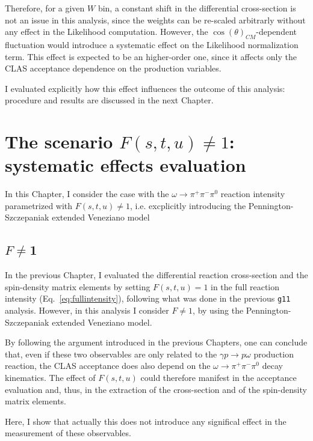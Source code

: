 \documentclass[a4paper,10pt]{report}
\newcommand{\decay}{$\omega \rightarrow \pi^+ \pi^- \pi^0$ }
\newcommand{\production}{$\gamma p \rightarrow p \omega$ }
\begin{document}
Therefore, for a given $W$ bin, a constant shift in the differential cross-section is not an issue in this analysis, since the weights can be re-scaled arbitrarly without any effect in the Likelihood computation. However, the $\cos(\theta)_{CM}$-dependent fluctuation would introduce a systematic effect on the Likelihood normalization term. This effect is expected to be an higher-order one, since it affects only the CLAS acceptance dependence on the production variables.

I evaluated explicitly how this effect influences the outcome of this analysis: procedure and results are discussed in the next Chapter.



\chapter{The scenario $F(s,t,u) \neq 1$: systematic effects evaluation}

In this Chapter, I consider the case with the \decay reaction intensity parametrized with $F(s,t,u) \neq 1$, i.e. excplicitly introducing the Pennington-Szczepaniak extended Veneziano model

\section{$F\neq$1}

In the previous Chapter, I evaluated the differential reaction cross-section and the spin-density matrix elements by setting $F(s,t,u)=1$ in the full reaction intensity (Eq.~\ref{eq:fullintensity}), following what was done in the previous \texttt{g11} analysis. 
However, in this analysis I consider $F \neq 1$, by using the Pennington-Szczepaniak extended Veneziano model.

By following the argument introduced in the previous Chapters, one can conclude that, even if these two observables are only related to the \production production reaction, the CLAS acceptance does also depend on the \decay decay kinematics. 
The effect of $F(s,t,u)$ could therefore manifest in the acceptance evaluation and, thus, in the extraction of the cross-section and of the spin-density matrix elements.

Here, I show that actually this does not introduce any significal effect in the measurement of these observables.
\end{document}
